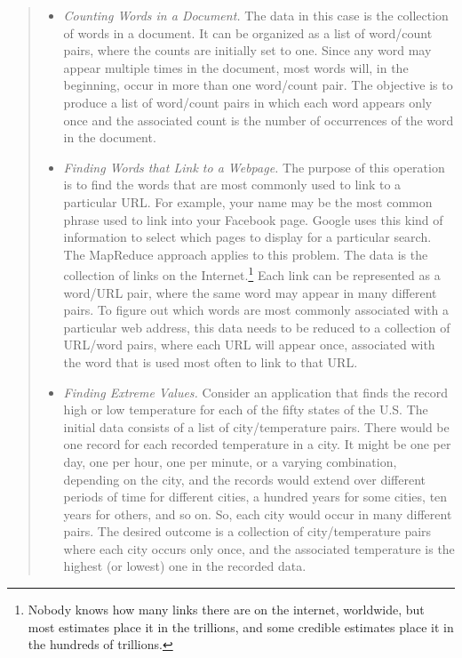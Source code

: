 \begin{quote}
\begin{itemize}
\item \emph{Counting Words in a Document.}  The data in this
case is the collection of words in a document.  It can be
organized as a list of word/count pairs, where the counts
are initially set to one.  Since any word may appear
multiple times in the document, most words will, in the beginning,
occur in more than one word/count pair.
The objective is to produce a list of word/count pairs
in which each word appears only once and the associated
count is the number of occurrences of
the word in the document.

\item \emph{Finding Words that Link to a Webpage.}  The
purpose of this operation is to find the words that are
most commonly used to link to a particular URL.
For example, your name may be the most
common phrase used to link into your Facebook page.
Google uses this kind of information to select which
pages to display for a particular search.
The MapReduce approach applies to this problem.
The data is the
collection of links on the Internet.\footnote{Nobody knows how many
links there are on the internet, worldwide,
but most estimates place it in the trillions,
and some credible estimates place it in the hundreds of trillions. }
Each link can be represented as a word/URL pair,
where the same word may appear in many different pairs.
To figure out which words are most commonly associated with
a particular web address,
this data needs to be reduced to a collection of
URL/word pairs, where each URL will appear once, associated
with the word that is used most often to link to that URL.

\item \emph{Finding Extreme Values.}  Consider
an application that finds the record high or low temperature
for each of the fifty states of the U.S.
The initial data consists of a list of
city/temperature pairs.  There would be one record for each
recorded temperature in a city. It might be one per day,
one per hour, one per minute, or a varying combination,
depending on the city, and the records would extend over
different periods of time for different cities,
a hundred years for some cities, ten years for others,
and so on. So, each city would occur in many different pairs.
The desired outcome is a collection of city/temperature
pairs where each city occurs only once, and the associated
temperature is the highest (or lowest) one in the recorded data.
\end{itemize}
\end{quote}

